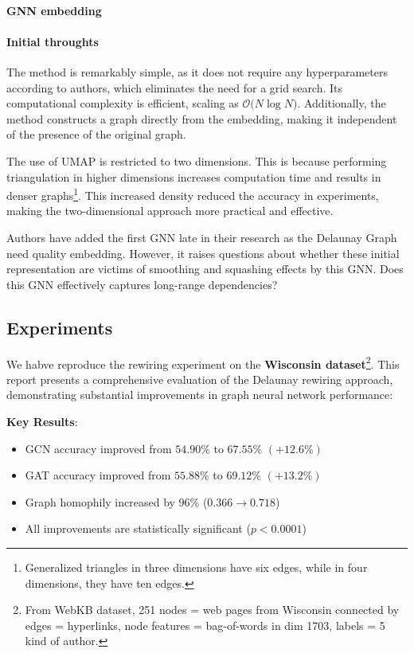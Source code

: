 \documentclass{article}
\theoremstyle{plain}
\theoremstyle{definition}
\theoremstyle{remark}
\begin{document}
\paragraph{GNN embedding}





\paragraph{Initial throughts}
The method is remarkably simple, as it does not require any hyperparameters according to authors, 
which eliminates the need for a grid search. Its computational complexity is 
efficient, scaling as $\mathcal{O} \big( N \log N \big)$. 
Additionally, the method constructs a graph directly from the embedding, 
making it independent of the presence of the original graph.

The use of UMAP is restricted to two dimensions. This is because performing 
triangulation in higher dimensions increases computation time and 
results in denser graphs\footnote{Generalized triangles in three dimensions
 have six edges, while in four dimensions, they have ten edges.}. 
This increased density reduced the accuracy in experiments, making the two-dimensional approach more practical and effective.

Authors have added the first GNN late in their research as the Delaunay Graph 
need quality embedding. However, it raises questions about whether these initial
representation are victims of smoothing and squashing effects by this GNN.
Does this GNN effectively captures long-range dependencies?


\subsection{Experiments}
We habve reproduce the rewiring experiment on the \textbf{Wisconsin dataset}\footnote{
From WebKB dataset, 251 nodes = web pages from Wisconsin connected
by edges = hyperlinks, node features = bag-of-words in dim 1703, labels =  5 kind of author.}.
This report presents a comprehensive evaluation of the Delaunay rewiring 
approach, demonstrating substantial improvements in graph neural network performance:

\textbf{Key Results}:
\begin{itemize}
    \item GCN accuracy improved from $54.90\%$ to $67.55\%$ $(+12.6\%)$
    \item GAT accuracy improved from $55.88\%$ to $69.12\%$ $(+13.2\%)$
    \item Graph homophily increased by $96\%$ ($0.366 \to  0.718$)
    \item All improvements are statistically significant ($p<0.0001$)
\end{itemize}
\end{document}
